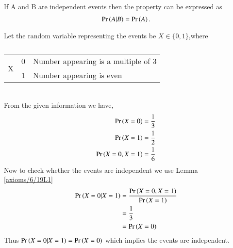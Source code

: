 \begin{lemma}
    If A and B are independent events then the property can be expressed as \label{axioms/6/19L1}
    \begin{align}
      \Pr\left(A|B\right)=\Pr\left(A\right).   
    \end{align} 
    \end{lemma} 
    Let the random variable representing the events be $X \in \{0,1\}$,where
    \begin{table}[ht]
    \begin{tabular}{|l|l|l|}
    \hline
    \multirow{2}{*}{X} & 0 & Number appearing is a multiple of 3 \\ \cline{2-3} 
                       & 1 & Number appearing is even            \\ \hline
    \end{tabular}
    \caption{}
    \label{axioms/6/19/table}
    \end{table}
    \\
    From the given information we have,
    \begin{align}
        \Pr\left(X=0\right) = \frac{1}{3} \\
        \Pr\left(X=1\right) = \frac{1}{2} \\
        \Pr\left(X=0,X=1\right) = \frac{1}{6}
    \end{align}
    Now to check whether the events are independent we use Lemma \ref{axioms/6/19L1}
    \begin{align}
       \Pr\left(X=0|X=1\right) &= \frac{\Pr\left(X=0,X=1\right)}{\Pr\left(X=1\right)} \\
       &= \frac{1}{3} \\ 
       &= \Pr\left(X=0\right)
    \end{align}
    Thus $\Pr\left(X=0|X=1\right)=\Pr\left(X=0\right)$ which implies the  events are independent.